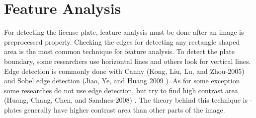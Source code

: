 \section{Feature Analysis}

For detecting the license plate, feature analysis must be done after an image is preprocessed properly.
Checking the edges for detecting any rectangle shaped area is the most common technique for feature analysis.
To detect the plate boundary, some researchers use horizontal lines and others look for vertical lines.
Edge detection is commonly done with Canny (Kong, Liu, Lu, and Zhou-2005) \cite{Kong2005}  and Sobel edge detection (Jiao, Ye, and Huang 2009 \cite{jiao_ye_huang_2009}).
As for some exception some researches do not use edge detection, but try to find high contrast area (Huang, Chang, Chen, and Sandnes-2008) \cite{HUANG2008}. The theory behind this technique is - plates generally have higher contrast area than other parts of the image.